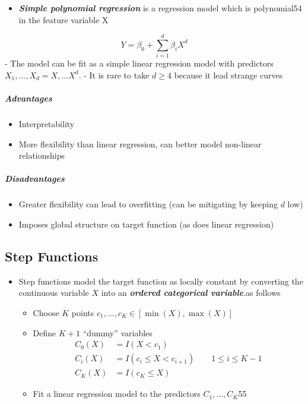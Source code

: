 \documentclass[11pt]{article}
\providecommand{\tightlist}{%
      \setlength{\itemsep}{0pt}\setlength{\parskip}{0pt}}
\begin{document}
    \begin{itemize}
\tightlist
\item
  \textbf{\emph{Simple polynomial regression}} is a regression model
  which is polynomial54 in the feature variable X
\end{itemize}

\[Y = \beta_0 + \sum_{i = 1}^d \beta_iX^d\] - The model can be fit as a
simple linear regression model with predictors
\(X_1, \dots, X_d = X, \dots X^d\). - It is rare to take
\(d \geqslant 4\) because it lead strange curves

    \hypertarget{advantages}{%
\subparagraph{Advantages}\label{advantages}}

    \begin{itemize}
\tightlist
\item
  Interpretability
\item
  More flexibility than linear regression, can better model non-linear
  relationships
\end{itemize}

    \hypertarget{disadvantages}{%
\subparagraph{Disadvantages}\label{disadvantages}}

    \begin{itemize}
\tightlist
\item
  Greater flexibility can lead to overfitting (can be mitigating by
  keeping \(d\) low)
\item
  Imposes global structure on target function (as does linear
  regression)
\end{itemize}

    \hypertarget{step-functions}{%
\subsection{Step Functions}\label{step-functions}}

    \begin{itemize}
\tightlist
\item
  Step functions model the target function as locally constant by
  converting the continuous variable \(X\) into an \textbf{\emph{ordered
  categorical variable}}.as follows

  \begin{itemize}
  \tightlist
  \item
    Choose \(K\) points \(c_1, \dots, c_K \in [\min(X), \max(X)]\)
  \item
    Define \(K + 1\) ``dummy'' variables \begin{align*}
      C_0(X) &= I(X < c_1)\\
      C_i(X) &= I(c_i \leqslant X < c_{i+1})\qquad 1 \leqslant i \leqslant K - 1\\
      C_K(X) &= I(c_K \leqslant X)
      \end{align*}
  \item
    Fit a linear regression model to the predictors
    \(C_1, \dots, C_K\)55
  \end{itemize}
\end{itemize}
\end{document}
